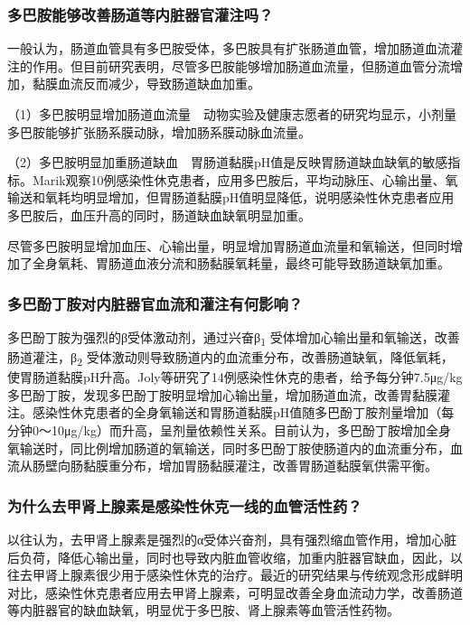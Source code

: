 \subsubsection{多巴胺能够改善肠道等内脏器官灌注吗？}

一般认为，肠道血管具有多巴胺受体，多巴胺具有扩张肠道血管，增加肠道血流灌注的作用。但目前研究表明，尽管多巴胺能够增加肠道血流量，但肠道血管分流增加，黏膜血流反而减少，导致肠道缺血加重。

（1）多巴胺明显增加肠道血流量　动物实验及健康志愿者的研究均显示，小剂量多巴胺能够扩张肠系膜动脉，增加肠系膜动脉血流量。

（2）多巴胺明显加重肠道缺血　胃肠道黏膜pH值是反映胃肠道缺血缺氧的敏感指标。Marik观察10例感染性休克患者，应用多巴胺后，平均动脉压、心输出量、氧输送和氧耗均明显增加，但胃肠道黏膜pH值明显降低，说明感染性休克患者应用多巴胺后，血压升高的同时，肠道缺血缺氧明显加重。

尽管多巴胺明显增加血压、心输出量，明显增加胃肠道血流量和氧输送，但同时增加了全身氧耗、胃肠道血液分流和肠黏膜氧耗量，最终可能导致肠道缺氧加重。

\subsubsection{多巴酚丁胺对内脏器官血流和灌注有何影响？}

多巴酚丁胺为强烈的β受体激动剂，通过兴奋β\textsubscript{1}
受体增加心输出量和氧输送，改善肠道灌注，β\textsubscript{2}
受体激动则导致肠道内的血流重分布，改善肠道缺氧，降低氧耗，使胃肠道黏膜pH升高。Joly等研究了14例感染性休克的患者，给予每分钟7.5μg/kg多巴酚丁胺，发现多巴酚丁胺明显增加心输出量，增加肠道血流，改善胃黏膜灌注。感染性休克患者的全身氧输送和胃肠道黏膜pH值随多巴酚丁胺剂量增加（每分钟0～10μg/kg）而升高，呈剂量依赖性关系。目前认为，多巴酚丁胺增加全身氧输送时，同比例增加肠道的氧输送，同时多巴酚丁胺使肠道内的血流重分布，血流从肠壁向肠黏膜重分布，增加胃肠黏膜灌注，改善胃肠道黏膜氧供需平衡。

\subsubsection{为什么去甲肾上腺素是感染性休克一线的血管活性药？}

以往认为，去甲肾上腺素是强烈的α受体兴奋剂，具有强烈缩血管作用，增加心脏后负荷，降低心输出量，同时也导致内脏血管收缩，加重内脏器官缺血，因此，以往去甲肾上腺素很少用于感染性休克的治疗。最近的研究结果与传统观念形成鲜明对比，感染性休克患者应用去甲肾上腺素，可明显改善全身血流动力学，改善肠道等内脏器官的缺血缺氧，明显优于多巴胺、肾上腺素等血管活性药物。

